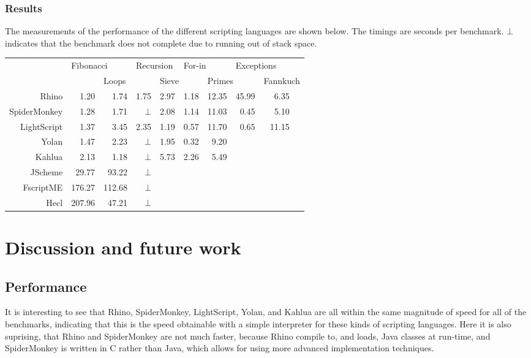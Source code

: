 \documentclass[11pt]{report}
\begin{document}
\subsection{Results}
The measurements of the performance of the different scripting languages are shown below. The timings are seconds per benchmark. $\bot$ indicates that the benchmark does not complete due to running out of stack space.

\begin{center} \begin{tabular}{|r|r|r|r|r|r|r|r|rr|} \hline 
& \multicolumn{2}{|l|}{Fibonacci} & \multicolumn{2}{|l|}{Recursion} & \multicolumn{2}{|l|}{For-in} & \multicolumn{2}{|l}{Exceptions} & \\
& & \multicolumn{2}{|l|}{Loops} & \multicolumn{2}{|l|}{Sieve} & \multicolumn{2}{|l|}{Primes} & \multicolumn{2}{|l|}{Fannkuch} \\
\hline Rhino       & 1.20 & 1.74 & 1.75   & 2.97 & 1.18 & 12.35 & 45.99 & 6.35 & \\ 
\hline SpiderMonkey& 1.28 & 1.71 & $\bot$ & 2.08 & 1.14 & 11.03 & 0.45  & 5.10 & \\ 
\hline LightScript & 1.37 & 3.45 & 2.35   & 1.19 & 0.57 & 11.70 & 0.65  & 11.15 & \\
\hline Yolan       & 1.47 & 2.23 & $\bot$ & 1.95 & 0.32 &  9.20 &  &  & \\
\hline Kahlua      & 2.13 & 1.18 & $\bot$ &  5.73 & 2.26 & 5.49 &  &  & \\ 
\hline JScheme    & 29.77 & 93.22 & $\bot$ & & & & & & \\ 
\hline FscriptME & 176.27 & 112.68& $\bot$ & & & & & & \\ 
\hline Hecl      & 207.96 & 47.21 & $\bot$ & & & & & & \\ 
\hline \end{tabular}
\end{center} 

\chapter{Discussion and future work}
\label{discussion}
\section{Performance}
It is interesting to see that Rhino, SpiderMonkey, LightScript, Yolan, and Kahlua are all within the same magnitude of speed for all of the benchmarks, indicating that this is the speed obtainable with a simple interpreter for these kinds of scripting languages. Here it is also suprising, that Rhino and SpiderMonkey are not much faster, because Rhino compile to, and loads, Java classes at run-time, and SpiderMonkey is written in C rather than Java, which allows for using more advanced implementation techniques.
\end{document}
